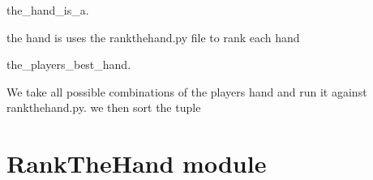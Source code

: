 \documentclass[letterpaper,10pt,english]{sphinxmanual}
\begin{document}

\begin{fulllineitems}
\label{\detokenize{PlayHoldEm:PlayHoldEm.the_hand_is_a}}
\sphinxAtStartPar
the\_hand\_is\_a.

\sphinxAtStartPar
the hand is uses the rankthehand.py file to rank each hand

\end{fulllineitems}


\begin{fulllineitems}
\label{\detokenize{PlayHoldEm:PlayHoldEm.the_players_best_hand}}
\sphinxAtStartPar
the\_players\_best\_hand.

\sphinxAtStartPar
We take all possible combinations of the players hand and run it
against rankthehand.py.
we then sort the tuple

\end{fulllineitems}



\section{RankTheHand module}
\label{\detokenize{RankTheHand:module-RankTheHand}}\label{\detokenize{RankTheHand:rankthehand-module}}\label{\detokenize{RankTheHand::doc}}

\begin{fulllineitems}
\label{\detokenize{RankTheHand:RankTheHand.cards_all_same_suit}}
\end{fulllineitems}
\end{document}
